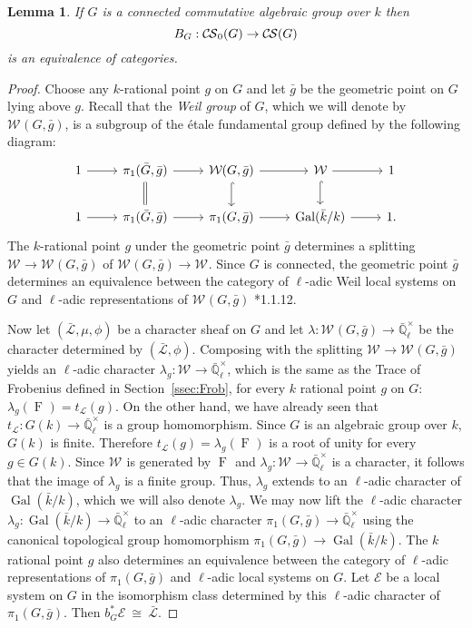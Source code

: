\documentclass[10pt]{amsart}
\theoremstyle{plain}
\newtheorem{lemma}[theorem]{Lemma}
\theoremstyle{definition}
\theoremstyle{remark}
\newcommand{\EE}{\mathbb{\bar Q}_\ell}
\newcommand{\bFq}{\bar{k}}
\newcommand{\Fq}{k}
\newcommand{\EEx}{\EE^\times}
\newcommand{\Weil}[1]{\mathcal{W}_{#1}}
\DeclareMathOperator{\Gal}{Gal}
\newcommand{\Frob}[1]{\operatorname{F}_{#1}}
\newcommand{\iso}{{\ \cong\ }}
\newcommand{\trFrob}[1]{t_{#1}}
\newcommand{\cs}[1]{{\mathcal{#1}}}
\newcommand{\gcs}[1]{{\mathcal{\bar #1}}}
\newcommand{\CS}{{\mathcal{C\hskip-0.8pt S}}}
\newcommand{\bCS}{{\CS_0}}
\newcommand{\bg}{\bar{g}}
\newcommand{\bG}{\bar{G}}
\begin{document}
\begin{lemma}\label{lem:bounded_connected}
If $G$ is a connected commutative algebraic group over $\Fq$ then 
\[
B_G : \bCS(G) \to \CS(G)
\]
 is an equivalence of categories.
\end{lemma}

\begin{proof}
Choose any $\Fq$-rational point $g$ on $G$ and let $\bg$ be the geometric point on $G$ lying above $g$.
Recall that the \emph{Weil group} of $G$, which we will denote by $\Weil{}(G,\bg)$, is a subgroup of the \'etale
fundamental group defined by the following diagram:
\[
 \begin{tikzcd}
 1 \rar & \ar[equal]{d} \pi_1(\bG, \bg) \rar & \Weil{}(G,\bg) \rar \dar[hook] & \Weil{} \rar \dar[hook] & 1 \\
 1 \rar &  \pi_1(\bG, \bg) \rar & \pi_1(G,\bg) \rar & \Gal(\bFq/\Fq) \rar & 1.
 \end{tikzcd}
\]
The $\Fq$-rational point $g$ under the geometric point $\bg$ determines a splitting
$\Weil{}\to \Weil{}(G,\bg)$ of $\Weil{}(G,\bg)\to \Weil{}$.
%
  Since $G$ is connected, the geometric point $\bg$ determines
  an equivalence between the category of $\ell$-adic Weil local systems on $G$ and
  $\ell$-adic representations of $\Weil{}(G,\bg)$ \cite{deligne:80a}*{1.1.12}.
  
  Now let $(\gcs{L},\mu,\phi)$ be a character sheaf on $G$
  and let $\lambda : \Weil{}(G, \bg) \to \EEx$ be the character determined by $(\gcs{L},\phi)$.
  Composing with the splitting $\Weil{} \to \Weil{}(G,\bg)$ yields an $\ell$-adic character
  $\lambda_g : \Weil{} \to \EEx$, which is the same as the Trace of Frobenius defined in Section~\ref{ssec:Frob}, for every $\Fq$ rational point $g$ on $G$:
  $
  \lambda_g(\Frob{}) =  \trFrob{\cs{L}}(g).
  $
%
  On the other hand, we have already seen that $\trFrob{\cs{L}} : G(\Fq) \to \EEx$
  is a group homomorphism. 
  Since $G$ is an algebraic group over $\Fq$, $G(\Fq)$ is finite.
  Therefore $\trFrob{\cs{L}}(g) = \lambda_g(\Frob{})$ is a root of unity
  for every $g\in G(\Fq)$.  Since $\Weil{}$ is generated by
  $\Frob{}$ and $\lambda_g : \Weil{} \to \EEx$ is
  a character, it follows that the image of $\lambda_g$ is a finite group.
  Thus, $\lambda_g$ extends to an $\ell$-adic character of $\Gal(\bFq/\Fq)$,
  which we will also denote $\lambda_g$.
%
  We may now lift the $\ell$-adic character $\lambda_g : \Gal(\bFq/\Fq) \to \EEx$
  to an $\ell$-adic character $\pi_1(G,\bg) \to \EEx$ using the canonical topological group homomorphism
  $\pi_1(G,\bg) \to \Gal(\bFq/\Fq)$. 
  The $\Fq$ rational point $g$ also
  determines an equivalence between the category of $\ell$-adic
  representations of $\pi_1(G,\bg)$ and $\ell$-adic local systems on $G$. Let
  $\cs{E}$ be a local system on $G$ in the isomorphism class
  determined by this $\ell$-adic character of $\pi_1(G,\bg)$.
  Then $b_G^*\cs{E} \iso \gcs{L}$.
  

\end{proof}
\end{document}
